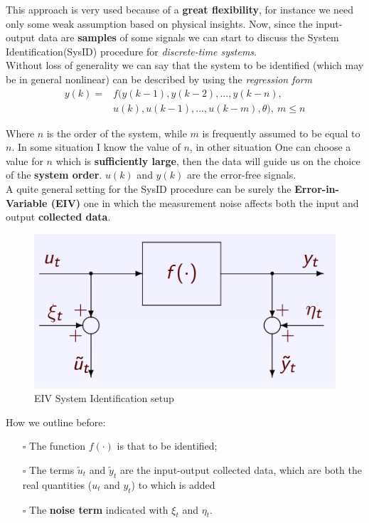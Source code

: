 \vspace{0.2cm}
\noindent
This approach is very used because of a \textbf{great flexibility}, for instance we need only some weak assumption based on physical insights.
Now, since the input-output data are \textbf{samples} of some signals we can start to discuss the System Identification(SysID) procedure for \textit{discrete-time systems}.\\
Without loss of generality we can say that the system to be identified (which may be in general nonlinear) can be described by using the \textit{regression form}
{\large{
    \begin{equation} \label{eq: regression_form}
        \begin{aligned}
            y(k)=&f(y(k-1), y(k-2), ...,y(k-n), \\
            &u(k), u(k-1), ..., u(k-m), \theta), \ m\le n
        \end{aligned}
    \end{equation}
}}

Where $n$ is the order of the system, while $m$ is frequently assumed to be equal to $n$. In some situation I know the value of $n$, in other situation One can choose a value for $n$ which is \textbf{sufficiently large}, then the data will guide us on the choice of the \textbf{system order}. $u(k)$ and $y(k)$ are the error-free signals.\\
A quite general setting for the SysID procedure can be surely the \textbf{Error-in-Variable (EIV)} one in which the measurement noise affects both the input and output \textbf{collected data}. 

\begin{figure}[h]
    \centering
    \includegraphics[scale=0.77]{images/EIV.png}
    \caption{EIV System Identification setup}
\end{figure}

\vspace{0.5cm}
\noindent
How we outline before:
\begin{itemize}
    \itemsep0em
    \item[$\square$] The function $f(\cdot)$ is that to be identified;
   \item[$\square$] The terms $\tilde{u}_t$ and $\tilde{y}_t$ are the input-output collected data, which are both the real quantities ($u_t$ and $y_t$) to which is added 
   \item[$\square$] The \textbf{noise term} indicated with $\xi_t$ and $\eta_t$.
\end{itemize}

